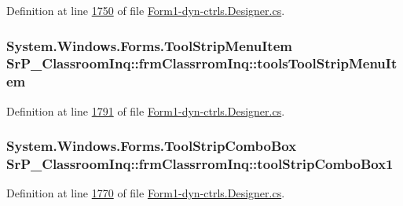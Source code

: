 \-Definition at line \hyperlink{_form1-dyn-ctrls_8_designer_8cs_source_l01750}{1750} of file \hyperlink{_form1-dyn-ctrls_8_designer_8cs_source}{\-Form1-\/dyn-\/ctrls.\-Designer.\-cs}.

\hypertarget{class_sr_p___classroom_inq_1_1frm_classrrom_inq_a89a0ae0ac6568cec51bb828874802c28}{
\subsubsection[{tools\-Tool\-Strip\-Menu\-Item}]{\setlength{\rightskip}{0pt plus 5cm}\-System.\-Windows.\-Forms.\-Tool\-Strip\-Menu\-Item {\bf \-Sr\-P\-\_\-\-Classroom\-Inq\-::frm\-Classrrom\-Inq\-::tools\-Tool\-Strip\-Menu\-Item}}}
\label{class_sr_p___classroom_inq_1_1frm_classrrom_inq_a89a0ae0ac6568cec51bb828874802c28}


\-Definition at line \hyperlink{_form1-dyn-ctrls_8_designer_8cs_source_l01791}{1791} of file \hyperlink{_form1-dyn-ctrls_8_designer_8cs_source}{\-Form1-\/dyn-\/ctrls.\-Designer.\-cs}.

\hypertarget{class_sr_p___classroom_inq_1_1frm_classrrom_inq_a0488696265840798a7bfd3cc7475f0af}{
\subsubsection[{tool\-Strip\-Combo\-Box1}]{\setlength{\rightskip}{0pt plus 5cm}\-System.\-Windows.\-Forms.\-Tool\-Strip\-Combo\-Box {\bf \-Sr\-P\-\_\-\-Classroom\-Inq\-::frm\-Classrrom\-Inq\-::tool\-Strip\-Combo\-Box1}}}
\label{class_sr_p___classroom_inq_1_1frm_classrrom_inq_a0488696265840798a7bfd3cc7475f0af}


\-Definition at line \hyperlink{_form1-dyn-ctrls_8_designer_8cs_source_l01770}{1770} of file \hyperlink{_form1-dyn-ctrls_8_designer_8cs_source}{\-Form1-\/dyn-\/ctrls.\-Designer.\-cs}.


